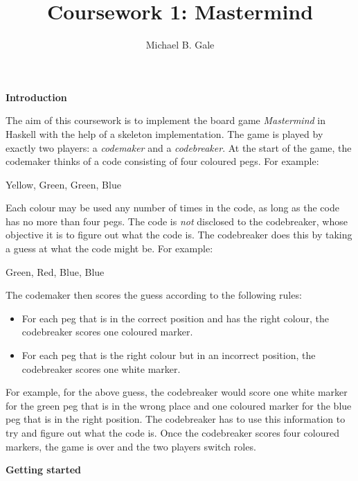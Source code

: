 \documentclass{cs256-shared/cs256}
\author{Michael B. Gale}
\title{Coursework 1: Mastermind}
\begin{document}
\makeheader

\textbf{Introduction}

The aim of this coursework is to implement the board game \emph{Mastermind} in Haskell with the help of a skeleton implementation. The game is played by exactly two players: a \emph{codemaker} and a \emph{codebreaker}. At the start of the game, the codemaker thinks of a code consisting of four coloured pegs. For example:
\begin{center}
    Yellow, Green, Green, Blue
\end{center}
Each colour may be used any number of times in the code, as long as the code has no more than four pegs. The code is \emph{not} disclosed to the codebreaker, whose objective it is to figure out what the code is. The codebreaker does this by taking a guess at what the code might be. For example:
\begin{center}
    Green, Red, Blue, Blue
\end{center}
The codemaker then scores the guess according to the following rules:
\begin{itemize}
    \item For each peg that is in the correct position and has the right colour, the codebreaker scores one coloured marker.
    \item For each peg that is the right colour but in an incorrect position, the codebreaker scores one white marker.
\end{itemize}
For example, for the above guess, the codebreaker would score one white marker for the green peg that is in the wrong place and one coloured marker for the blue peg that is in the right position. The codebreaker has to use this information to try and figure out what the code is. Once the codebreaker scores four coloured markers, the game is over and the two players switch roles.

\textbf{Getting started}
\end{document}
